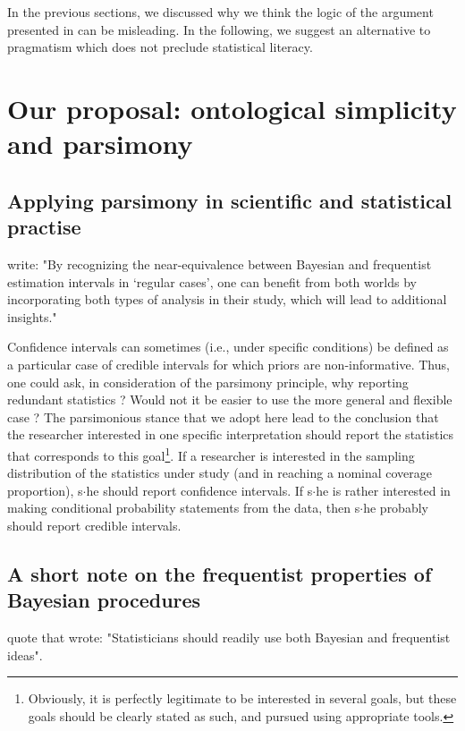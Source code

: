 \documentclass[a4paper,man,natbib,floatsintext,donotrepeattitle]{apa6}
\begin{document}
In the previous sections, we discussed why we think the logic of the argument presented in \cite{albers_credible_2018} can be misleading. In the following, we suggest an alternative to pragmatism which does not preclude statistical literacy.

\section{Our proposal: ontological simplicity and parsimony}

\subsection{Applying parsimony in scientific and statistical practise}

\cite{albers_credible_2018} write: "By recognizing the near-equivalence between Bayesian and frequentist estimation intervals in ‘regular cases’, one can benefit from both worlds by incorporating both types of analysis in their study, which will lead to additional insights."

Confidence intervals can sometimes (i.e., under specific conditions) be defined as a particular case of credible intervals for which priors are non-informative. Thus, one could ask, in consideration of the parsimony principle, why reporting redundant statistics ? Would not it be easier to use the more general and flexible case ? The parsimonious stance that we adopt here lead to the conclusion that the researcher interested in one specific interpretation should report the statistics that corresponds to this goal\footnote{Obviously, it is perfectly legitimate to be interested in several goals, but these goals should be clearly stated as such, and pursued using appropriate tools.}. If a researcher is interested in the sampling distribution of the statistics under study (and in reaching a nominal coverage proportion), s$\cdot$he should report confidence intervals. If s$\cdot$he is rather interested in making conditional probability statements from the data, then s$\cdot$he probably should report credible intervals.

\subsection{A short note on the frequentist properties of Bayesian procedures}

\cite{albers_credible_2018} quote \cite{bayarri_interplay_2004} that wrote: "Statisticians should readily use both Bayesian and frequentist ideas".
\end{document}
